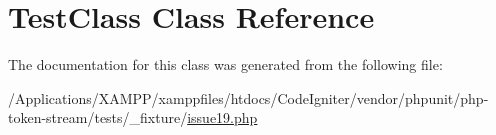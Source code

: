 \hypertarget{class_test_class}{}\section{Test\+Class Class Reference}
\label{class_test_class}


The documentation for this class was generated from the following file\+:\begin{DoxyCompactItemize}
\item 
/\+Applications/\+X\+A\+M\+P\+P/xamppfiles/htdocs/\+Code\+Igniter/vendor/phpunit/php-\/token-\/stream/tests/\+\_\+fixture/\mbox{\hyperlink{issue19_8php}{issue19.\+php}}\end{DoxyCompactItemize}
